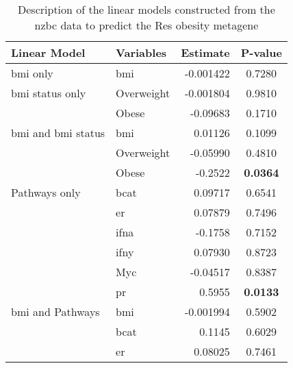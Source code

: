 	\begin{table}[htpb]
		\centering
		\caption{Description of the linear models constructed from the \gls{nzbc} data to predict the Res obesity metagene}
		\label{tab:lm_sig_var_res}
		\begin{threeparttable}
			\begin{tabular}{llrc}
				Linear Model & Variables & Estimate & P-value\\
				\hline
				\hline
				\rule{0pt}{2.25ex}\gls{bmi} only                           & \gls{bmi}  & -0.001422 & 0.7280 \\
				\hline
				\rule{0pt}{2.25ex}\gls{bmi} status only                    & Overweight & -0.001804 & 0.9810 \\
                                                                           & Obese      & -0.09683  & 0.1710 \\
				\hline
				\rule{0pt}{2.25ex}\gls{bmi} and \gls{bmi} status           & \gls{bmi}  & 0.01126   & 0.1099 \\
                                                                           & Overweight & -0.05990  & 0.4810 \\
                                                                           & Obese      & -0.2522   & \bfseries 0.0364  \\
				\hline
				\rule{0pt}{2.25ex}Pathways only                            & \gls{bcat} & 0.09717   & 0.6541 \\
                                                                           & \gls{er}   & 0.07879   & 0.7496 \\
                                                                           & \gls{ifna} & -0.1758   & 0.7152 \\
                                                                           & \gls{ifny} & 0.07930   & 0.8723 \\
                                                                           & Myc        & -0.04517  & 0.8387 \\
                                                                           & \gls{pr}   & 0.5955    & \bfseries 0.0133  \\
				\hline
				\rule{0pt}{2.25ex}\gls{bmi} and Pathways                   & \gls{bmi}  & -0.001994 & 0.5902 \\
                                                                           & \gls{bcat} & 0.1145    & 0.6029 \\
                                                                           & \gls{er}   & 0.08025   & 0.7461 \\

\end{tabular}
\end{threeparttable}
\end{table}

